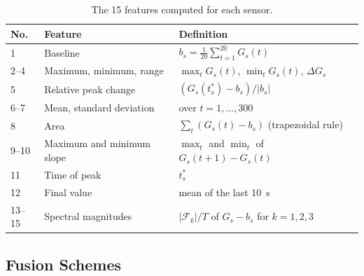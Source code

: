 \begin{table}[!htbp]
\centering
\caption[Features computed for each sensor]{The 15 features computed for each sensor.}
\label{tab:features}
\footnotesize
\begin{tabular}{lll}
\toprule
\textbf{No.} & \textbf{Feature} & \textbf{Definition} \\
\midrule
1 & Baseline & $b_s = \frac{1}{20}\sum_{t=1}^{20} G_s(t)$ \\
2--4 & Maximum, minimum, range & $\max_t G_s(t)$, $\min_t G_s(t)$, $\Delta G_s$ \\
5 & Relative peak change & $(G_s(t^{*}_s) - b_s)/|b_s|$ \\
6--7 & Mean, standard deviation & over $t = 1, \dots, 300$ \\
8 & Area & $\sum_t (G_s(t) - b_s)$ (trapezoidal rule) \\
9--10 & Maximum and minimum slope & $\max_t$ and $\min_t$ of $G_s(t+1) - G_s(t)$ \\
11 & Time of peak & $t^{*}_s$ \\
12 & Final value & mean of the last 10~s \\
13--15 & Spectral magnitudes & $|\mathcal{F}_k|/T$ of $G_s - b_s$ for $k = 1, 2, 3$ \\
\bottomrule
\end{tabular}
\end{table}

\subsection{Fusion Schemes}

